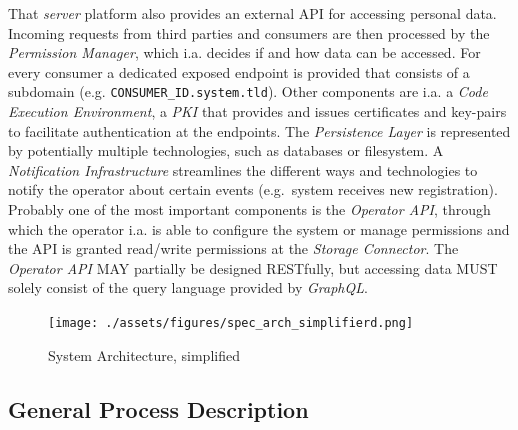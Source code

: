 \documentclass[12pt,english,a4paper,titlepage,cleardoublepage=empty,dottedtoc]{report}
\begin{document}
That \emph{server} platform also provides an external API for accessing
personal data. Incoming requests from third parties and consumers are
then processed by the \emph{Permission Manager}, which i.a. decides if
and how data can be accessed. For every consumer a dedicated exposed
endpoint is provided that consists of a subdomain (e.g.
\texttt{CONSUMER\_ID.system.tld}). Other components are i.a. a
\emph{Code Execution Environment}, a \emph{PKI} that provides and issues
certificates and key-pairs to facilitate authentication at the
endpoints. The \emph{Persistence Layer} is represented by potentially
multiple technologies, such as databases or filesystem. A
\emph{Notification Infrastructure} streamlines the different ways and
technologies to notify the operator about certain events (e.g.~system
receives new registration). Probably one of the most important
components is the \emph{Operator API}, through which the operator i.a.
is able to configure the system or manage permissions and the API is
granted read/write permissions at the \emph{Storage Connector}. The
\emph{Operator API} MAY partially be designed RESTfully, but accessing
data MUST solely consist of the query language provided by
\emph{GraphQL}.

\begin{figure}
\centering
\texttt{[image: ./assets/figures/spec\_arch\_simplifierd.png]}
\caption{System Architecture,
simplified\label{fig:spec_arch_simplifier}}
\end{figure}

\subsection{General Process
Description}\label{general-process-description}
\end{document}
